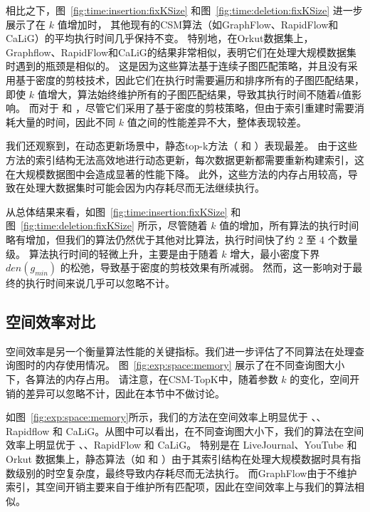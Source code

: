 相比之下，图~\ref{fig:time:insertion:fixKSize} 和图~\ref{fig:time:deletion:fixKSize} 进一步展示了在 $k$ 值增加时，
其他现有的CSM算法（如GraphFlow、RapidFlow和CaLiG）的平均执行时间几乎保持不变。
特别地，在Orkut数据集上，Graphflow、RapidFlow和CaLiG的结果非常相似，表明它们在处理大规模数据集时遇到的瓶颈是相似的。
这是因为这些算法基于连续子图匹配策略，并且没有采用基于密度的剪枝技术，因此它们在执行时需要遍历和排序所有的子图匹配结果，即使 $k$ 值增大，算法始终维护所有的子图匹配结果，导致其执行时间不随着$k$值影响。
而对于 \itk 和 \pm，尽管它们采用了基于密度的剪枝策略，但由于索引重建时需要消耗大量的时间，因此不同 $k$ 值之间的性能差异不大，整体表现较差。

我们还观察到，在动态更新场景中，静态top-k方法（ \itk 和 \pm）表现最差。
由于这些方法的索引结构无法高效地进行动态更新，每次数据更新都需要重新构建索引，这在大规模数据图中会造成显著的性能下降。
此外，这些方法的内存占用较高，导致在处理大数据集时可能会因为内存耗尽而无法继续执行。


从总体结果来看，如图~\ref{fig:time:insertion:fixKSize} 和图~\ref{fig:time:deletion:fixKSize} 所示，尽管随着 $k$ 值的增加，所有算法的执行时间略有增加，但我们的算法仍然优于其他对比算法，执行时间快了约 2 至 4 个数量级。
算法执行时间的轻微上升，主要是由于随着 $k$ 增大，最小密度下界 $den(g_{min})$ 的松弛，导致基于密度的剪枝效果有所减弱。
然而，这一影响对于最终的执行时间来说几乎可以忽略不计。


\subsection{空间效率对比}
\label{ch5:space}

空间效率是另一个衡量算法性能的关键指标。我们进一步评估了不同算法在处理查询图时的内存使用情况。
图~\ref{fig:exp:space:memory} 展示了在不同查询图大小下，各算法的内存占用。
请注意，在CSM-TopK中，随着参数 $k$ 的变化，空间开销的差异可以忽略不计，因此在本节中不做讨论。

如图~\ref{fig:exp:space:memory}所示，我们的方法在空间效率上明显优于 \itk、\pm、Rapidflow 和 CaLiG。从图中可以看出，在不同查询图大小下，我们的算法在空间效率上明显优于 \itk、\pm、RapidFlow 和 CaLiG。
特别是在 LiveJournal、YouTube 和 Orkut 数据集上，静态算法（如 \itk 和 \pm）由于其索引结构在处理大规模数据时具有指数级别的时空复杂度，最终导致内存耗尽而无法执行。
而GraphFlow由于不维护索引，其空间开销主要来自于维护所有匹配项，因此在空间效率上与我们的算法相似。


